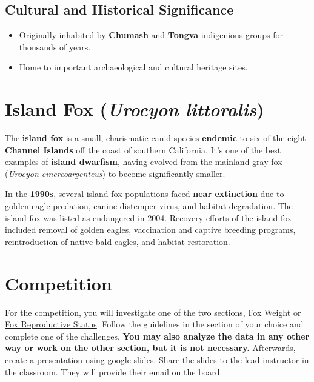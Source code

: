 \documentclass[
  letterpaper,
]{report}
\providecommand{\tightlist}{%
  \setlength{\itemsep}{0pt}\setlength{\parskip}{0pt}}\usepackage{longtable,booktabs,array}
\begin{document}
\subsection{Cultural and Historical
Significance}\label{cultural-and-historical-significance}

\begin{itemize}
\tightlist
\item
  Originally inhabited by
  \href{https://www.nps.gov/chis/learn/historyculture/nativeinhabitants.htm\#:~:text=With\%20a\%20current\%20population\%20nearly,organized\%20Chumash\%20tribal\%20groups\%20exist}{\textbf{Chumash}
  and \textbf{Tongva}} indigenious groups for thousands of years.
\item
  Home to important archaeological and cultural heritage sites.
\end{itemize}

\section{\texorpdfstring{Island Fox (\emph{Urocyon
littoralis})}{Island Fox (Urocyon littoralis)}}\label{island-fox-urocyon-littoralis}

The \textbf{island fox} is a small, charismatic canid species
\textbf{endemic} to six of the eight \textbf{Channel Islands} off the
coast of southern California. It's one of the best examples of
\textbf{island dwarfism}, having evolved from the mainland gray fox
(\emph{Urocyon cinereoargenteus}) to become significantly smaller.

In the \textbf{1990s}, several island fox populations faced \textbf{near
extinction} due to golden eagle predation, canine distemper virus, and
habitat degradation. The island fox was listed as endangered in 2004.
Recovery efforts of the island fox included removal of golden eagles,
vaccination and captive breeding programs, reintroduction of native bald
eagles, and habitat restoration.

\section{Competition}\label{competition}

For the competition, you will investigate one of the two sections,
\hyperref[fox-weight]{Fox Weight} or \hyperref[fox-rs]{Fox Reproductive
Status}. Follow the guidelines in the section of your choice and
complete one of the challenges. \textbf{You may also analyze the data in
any other way or work on the other section, but it is not necessary.}
Afterwards, create a presentation using google slides. Share the slides
to the lead instructor in the classroom. They will provide their email
on the board.
\end{document}
